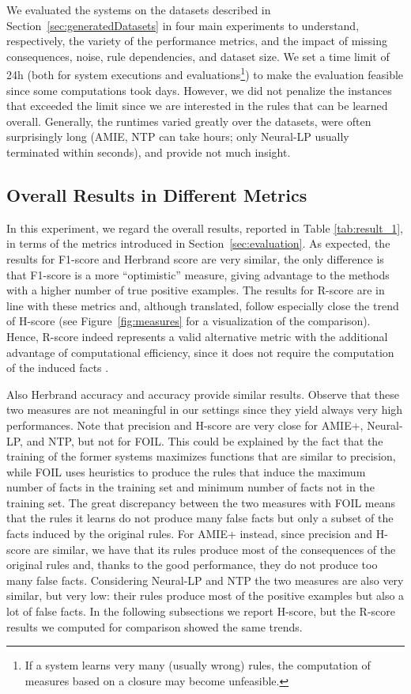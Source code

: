\documentclass[letterpaper]{article} \usepackage{aaai20}  \usepackage{times}  \usepackage{helvet} \usepackage{courier}  \usepackage[hyphens]{url}  \usepackage{graphicx} \urlstyle{rm} \def\UrlFont{\rm}  \usepackage{graphicx}  \frenchspacing  \setlength{\pdfpagewidth}{8.5in}  \setlength{\pdfpageheight}{11in}  \usepackage{amsthm}
\theoremstyle{definition}
\begin{document}
We evaluated the systems on the datasets described in Section~\ref{sec:generatedDatasets} in four main experiments to understand, respectively, the variety of the performance metrics, and the impact of missing consequences, noise, rule dependencies, and dataset size.
We set a time limit of 24h (both for  system executions and  evaluations\footnote{If a system learns very many (usually wrong) rules, the computation of measures based on a closure may become unfeasible.}) to make the evaluation feasible since some computations took days. However, we did not penalize the instances that exceeded the limit since we are interested in the rules that can be learned overall. Generally, the runtimes varied greatly over the datasets, were often surprisingly long (AMIE, NTP can take hours; only Neural-LP usually terminated within seconds), and provide not much insight.



\subsection{Overall Results in Different Metrics}\label{sec:exp1}


In this experiment, we regard the overall results, reported in Table \ref{tab:result_1}, in terms of the metrics introduced in Section~\ref{sec:evaluation}.
As expected, the results for F1-score and Herbrand score are very similar, the only difference is that F1-score is a more ``optimistic'' measure, giving advantage to the methods with a higher number of true positive examples.
The results for R-score are in line with these metrics and, although translated, follow especially close the trend of H-score  
(see Figure~\ref{fig:measures} for a visualization of the comparison). Hence, R-score indeed represents
a valid alternative metric with the additional advantage of computational efficiency, since
it does not require the computation of the induced facts .

Also Herbrand accuracy and accuracy provide similar results. Observe that these two measures are not meaningful in our settings since they yield always very high performances.
Note that precision and H-score are very close for AMIE+, Neural-LP, and NTP, but not for FOIL.
This could be explained by the fact that the training of the former systems maximizes functions that are similar to precision, while FOIL uses heuristics to produce the rules that induce the maximum number of facts in the training set and minimum number of facts not in the training set.
 The great discrepancy between the two measures with FOIL means that the rules it learns do not produce many false facts but only a subset of the facts induced by the original rules.
For AMIE+ instead, since precision and H-score are similar, we have that its rules  produce most of the consequences of the original rules and, thanks to the good performance, they do not produce too many false facts.
Considering Neural-LP and NTP the two measures are also very similar, but very low: their rules produce most of the positive examples but also a lot of false facts.
In the following subsections we report H-score, but the R-score results we computed for comparison showed the same trends.
\end{document}
